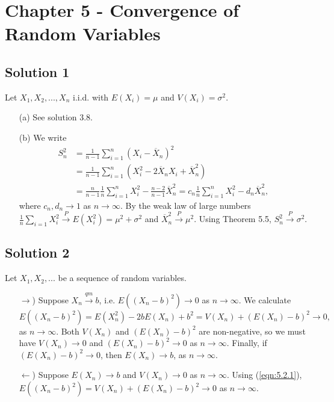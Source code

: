 \section*{Chapter 5 - Convergence of Random Variables}

\subsection*{Solution 1}

Let $X_1, X_2, ..., X_n$ i.i.d. with $E(X_i) = \mu$ and $V(X_i) = \sigma^2$.

\begin{itemize}
    \item[(a)] See solution 3.8.
    \item[(b)] We write
        \begin{equation*}
            \begin{split}
                S_n^2 &= \frac{1}{n - 1} \sum_{i = 1}^n (X_i - \overline{X}_n)^2 \\
                    &= \frac{1}{n - 1} \sum_{i = 1}^n (X_i^2 - 2 \overline{X}_n X_i + \overline{X}_n^2) \\
                    &= \frac{n}{n - 1} \frac{1}{n} \sum_{i = 1}^n X_i^2 - \frac{n - 2}{n - 1} \overline{X}_n^2
                    = c_n \frac{1}{n} \sum_{i = 1}^n X_i^2 - d_n \overline{X}_n^2,
            \end{split}
        \end{equation*}
        where $c_n, d_n \to 1$ as $n \to \infty$.
        By the weak law of large numbers $\frac{1}{n} \sum_{i = 1} X_i^2 \xrightarrow{P} E(X_i^2) = \mu^2 + \sigma^2$ and $\overline{X}_n^2 \xrightarrow{P} \mu^2$.
        Using Theorem 5.5, $S_n^2 \xrightarrow{P} \sigma^2$.
\end{itemize}


\subsection*{Solution 2}

Let $X_1, X_2, ...$ be a sequence of random variables.
\begin{itemize}
    \item[$\rightarrow$)] Suppose $X_n \xrightarrow{qm} b$, i.e. $E((X_n - b)^2) \to 0$ as $n \to \infty$.
        We calculate
        \begin{equation}
            \label{eqn:5.2.1}
            E((X_n - b)^2) = E(X_n^2) - 2bE(X_n) + b^2
                = V(X_n) + (E(X_n) - b)^2
                \to 0,
        \end{equation}
        as $n \to \infty$.
        Both $V(X_n)$ and $(E(X_n) - b)^2$ are non-negative, so we must have $V(X_n) \to 0$ and $(E(X_n) - b)^2 \to 0$ as $n \to \infty$.
        Finally, if $(E(X_n) - b)^2 \to 0$, then $E(X_n) \to b$, as $n \to \infty$.
    \item[$\leftarrow$)] Suppose $E(X_n) \to b$ and $V(X_n) \to 0$ as $n \to \infty$.
        Using (\ref{eqn:5.2.1}), $E((X_n - b)^2) = V(X_n) + (E(X_n) - b)^2 \to 0$ as $n \to \infty$.
\end{itemize}


